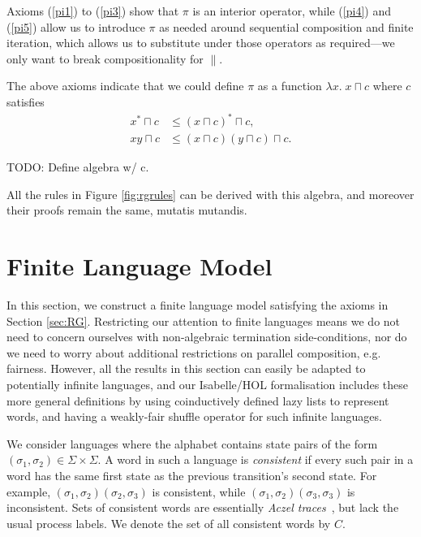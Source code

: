 \documentclass{llncs}
\begin{document}
Axioms (\ref{pi1}) to (\ref{pi3}) show that $\pi$ is an interior
operator, while (\ref{pi4}) and (\ref{pi5}) allow us to introduce
$\pi$ as needed around sequential composition and finite iteration,
which allows us to substitute under those operators as required---we
only want to break compositionality for $\|$.

The above axioms indicate that we could define $\pi$ as a function
$\lambda x.\; x \sqcap c$ where $c$ satisfies
\begin{align}
x^* \sqcap c &\le (x \sqcap c)^* \sqcap c, \label{con1}\\
xy \sqcap c &\le (x \sqcap c)(y \sqcap c) \sqcap c. \label{con2}
\end{align}

TODO: Define algebra w/ c.

All the rules in Figure \ref{fig:rgrules} can be derived with this
algebra, and moreover their proofs remain the same, mutatis
mutandis.

\section{Finite Language Model}
\label{sec:Model}

In this section, we construct a finite language model satisfying the
axioms in Section \ref{sec:RG}. Restricting our attention to finite
languages means we do not need to concern ourselves with non-algebraic
termination side-conditions, nor do we need to worry about additional
restrictions on parallel composition, e.g. fairness. However, all the
results in this section can easily be adapted to potentially
infinite languages, and our Isabelle/HOL formalisation includes these more
general definitions by using coinductively defined lazy lists to
represent words, and having a weakly-fair shuffle operator for such
infinite languages.

We consider languages where the alphabet contains state pairs of the
form $(\sigma_1,\sigma_2) \in \Sigma \times \Sigma$. A word in such a
language is \emph{consistent} if every such pair in a word has the
same first state as the previous transition's second state. For
example, $(\sigma_1,\sigma_2)(\sigma_2,\sigma_3)$ is consistent, while
$(\sigma_1,\sigma_2)(\sigma_3,\sigma_3)$ is inconsistent. Sets of
consistent words are essentially \emph{Aczel
  traces}~\cite{boer_formal_1999}, but lack the usual process
labels. We denote the set of all consistent words by $C$.
\end{document}
